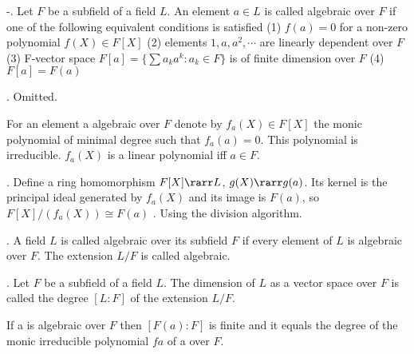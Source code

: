 
-\lemma. Let $F$ be a subfield of a field $L$. An element $a \in L$ is called 
algebraic over $F$ if one of the following equivalent conditions is satisfied 
  (1) $f(a) = 0$ for a non-zero polynomial $f(X) \in F[X]$
  (2) elements $1, a, a^2, \cdots$ are linearly dependent over $F$
  (3) F-vector space $F[a] = \{ \sum a_ka^k : a_k \in F \}$ is of finite dimension over $F$
  (4) $F[a] = F(a)$

\proof. Omitted.

  For an element a algebraic over $F$ denote by
                                $f_a(X) \in F[X]$
the monic polynomial of minimal degree such that $f_a(a) = 0$. 
  This polynomial is irreducible. $f_a(X)$ is a linear polynomial iff $a \in F$.

\lemma. Define a ring homomorphism $F[X] \rarr L$, $g(X) \rarr g(a)$. Its kernel is the
principal ideal generated by $f_a(X)$ and its image is $F(a)$, so
                              $F[X]/(f_a(X)) \cong F(a)$
\proof. Using the division algorithm.
                            
. A field $L$ is called algebraic over its subfield $F$ if every element of $L$ is
algebraic over $F$. The extension $L/F$ is called algebraic. 

. Let $F$ be a subfield of a field $L$. The dimension of $L$ as a vector space
over $F$ is called the degree $[L : F]$ of the extension $L/F$.

  If a is algebraic over $F$ then $[F(a) : F]$ is finite and it equals the degree of the
monic irreducible polynomial $fa$ of a over $F$.

